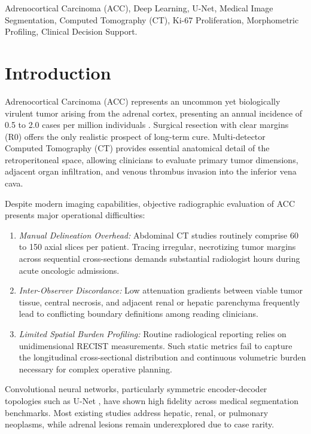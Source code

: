 \documentclass[conference]{IEEEtran}
\begin{document}
\begin{IEEEkeywords}
Adrenocortical Carcinoma (ACC), Deep Learning, U-Net, Medical Image Segmentation, Computed Tomography (CT), Ki-67 Proliferation, Morphometric Profiling, Clinical Decision Support.
\end{IEEEkeywords}

\section{Introduction}
Adrenocortical Carcinoma (ACC) represents an uncommon yet biologically virulent tumor arising from the adrenal cortex, presenting an annual incidence of 0.5 to 2.0 cases per million individuals \cite{moawad2023, fassnacht2018}. Surgical resection with clear margins (R0) offers the only realistic prospect of long-term cure. Multi-detector Computed Tomography (CT) provides essential anatomical detail of the retroperitoneal space, allowing clinicians to evaluate primary tumor dimensions, adjacent organ infiltration, and venous thrombus invasion into the inferior vena cava.

Despite modern imaging capabilities, objective radiographic evaluation of ACC presents major operational difficulties:
\begin{enumerate}
    \item \textit{Manual Delineation Overhead:} Abdominal CT studies routinely comprise 60 to 150 axial slices per patient. Tracing irregular, necrotizing tumor margins across sequential cross-sections demands substantial radiologist hours during acute oncologic admissions.
    \item \textit{Inter-Observer Discordance:} Low attenuation gradients between viable tumor tissue, central necrosis, and adjacent renal or hepatic parenchyma frequently lead to conflicting boundary definitions among reading clinicians.
    \item \textit{Limited Spatial Burden Profiling:} Routine radiological reporting relies on unidimensional RECIST measurements. Such static metrics fail to capture the longitudinal cross-sectional distribution and continuous volumetric burden necessary for complex operative planning.
\end{enumerate}

Convolutional neural networks, particularly symmetric encoder-decoder topologies such as U-Net \cite{ronneberger2015}, have shown high fidelity across medical segmentation benchmarks. Most existing studies address hepatic, renal, or pulmonary neoplasms, while adrenal lesions remain underexplored due to case rarity.
\end{document}
